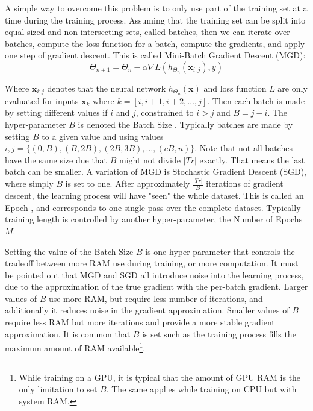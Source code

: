  A simple way to overcome this problem is to only use part of the training set at a time during the training process. Assuming that the training set can be split into equal sized and non-intersecting sets, called batches, then we can iterate over batches, compute the loss function for a batch, compute the gradients, and apply one step of gradient descent. This is called Mini-Batch Gradient Descent (MGD):
\vspace*{1em}
\begin{equation}
\Theta_{n+1} = \Theta_{n} - \alpha \nabla L(h_{\Theta_{n}}(\textbf{x}_{i:j}), y)
\label{background:SGD}
\end{equation}

Where $\textbf{x}_{i:j}$ denotes that the neural network $h_{\Theta_{n}}(\textbf{x})$ and loss function $L$ are only evaluated for inputs $\textbf{x}_k$ where $k = [i, i + 1, i + 2, \dots, j]$. Then each batch is made by setting different values if $i$ and $j$, constrained to $i > j$ and $B = j - i$. The hyper-parameter $B$ is denoted the Batch Size . Typically batches are made by setting $B$ to a given value and using values $i, j = \{ (0, B), (B, 2B), (2B, 3B), \dots, (cB, n) \}$. Note that not all batches have the same size due that $B$ might not divide $|Tr|$ exactly. That means the last batch can be smaller. A variation of MGD is Stochastic Gradient Descent (SGD), where simply $B$ is set to one.
After approximately $\frac{|Tr|}{B}$ iterations of gradient descent, the learning process will have "seen" the whole dataset. This is called an Epoch , and corresponds to one single pass over the complete dataset. Typically training length is controlled by another hyper-parameter, the Number of Epochs $M$.

Setting the value of the Batch Size $B$ is one hyper-parameter that controls the tradeoff between more RAM use during training, or more computation. It must be pointed out that MGD and SGD all introduce noise into the learning process, due to the approximation of the true gradient with the per-batch gradient. Larger values of $B$ use more RAM, but require less number of iterations, and additionally it reduces noise in the gradient approximation. Smaller values of $B$ require less RAM but more iterations and provide a more stable gradient approximation. It is common that $B$ is set such as the training process fills the maximum amount of RAM available\footnote{While training on a GPU, it is typical that the amount of GPU RAM is the only limitation to set $B$. The same applies while training on CPU but with system RAM.}.

